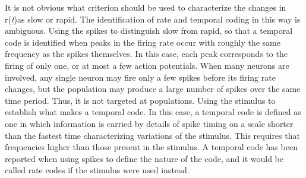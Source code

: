 \rem It is not obvious what criterion should be used to characterize the changes in r(\emph{t})as slow or rapid. The identification of rate and temporal coding in this way is ambiguous.
\exm Using the spikes to distinguish slow from rapid, so that a temporal code is identified when peaks in the firing rate occur with roughly the same frequency as the spikes themselves. In this case, each peak corresponds to the firing of only one, or at most a few action potentials.
\rem When many neurons are involved, any single neuron may fire only a few spikes before its firing rate changes, but the population may produce a large number of spikes over the same time period. Thus, it is not targeted at populations.
\exm Using the stimulus to establish what makes a temporal code. In this case, a temporal code is defined as one in which information is carried by details of spike timing on a scale shorter than the fastest time characterizing variations of the stimulus. This requires that frequencies higher than those present in the stimulus.
\rul A temporal code has been reported when using spikes to define the nature of the code, and it would be called rate codes if the stimulus
were used instead.







